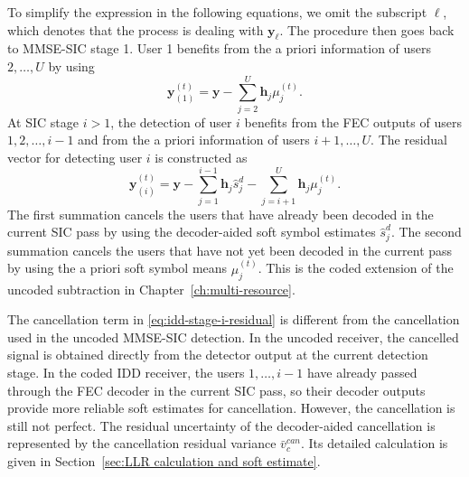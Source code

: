 To simplify the expression in the following equations, we omit the subscript $\ell$, which denotes that the process is dealing with $\bm{y}_{\ell}$. The procedure then goes back to MMSE-SIC stage 1. User 1 benefits from the a priori information of users $2,\ldots,U$ by using
\begin{equation}
    \label{eq:idd-stage-one-residual}
    \bm{y}_{(1)}^{(t)}
    =
    \bm{y}
    -
    \sum_{j=2}^{U}
    \bm{h}_{j}\mu^{(t)}_{j}.
\end{equation}
At SIC stage $i>1$, the detection of user $i$ benefits from the FEC outputs of users $1,2,\ldots,i-1$ and from the a priori information of users $i+1,\ldots,U$. The residual vector for detecting user $i$ is constructed as
\begin{equation}
    \label{eq:idd-stage-i-residual}
    \bm{y}_{(i)}^{(t)}
    =
    \bm{y}
    -
    \sum_{j=1}^{i-1}
    \bm{h}_{j}\hat{s}^{d}_{j}
    -
    \sum_{j=i+1}^{U}
    \bm{h}_{j}\mu^{(t)}_{j}.
\end{equation}
The first summation cancels the users that have already been decoded in the current SIC pass by using the decoder-aided soft symbol estimates $\hat{s}^{d}_{j}$. The second summation cancels the users that have not yet been decoded in the current pass by using the a priori soft symbol means $\mu^{(t)}_{j}$. This is the coded extension of the uncoded subtraction in Chapter~\ref{ch:multi-resource}.

The cancellation term in \eqref{eq:idd-stage-i-residual} is different from the cancellation used in the uncoded MMSE-SIC detection. In the uncoded receiver, the cancelled signal is obtained directly from the detector output at the current detection stage. In the coded IDD receiver, the users $1,\ldots,i-1$ have already passed through the FEC decoder in the current SIC pass, so their decoder outputs provide more reliable soft estimates for cancellation. However, the cancellation is still not perfect. The residual uncertainty of the decoder-aided cancellation is represented by the cancellation residual variance $\bar{v}_c^{can}$. Its detailed calculation is given in Section~\ref{sec:LLR calculation and soft estimate}.

